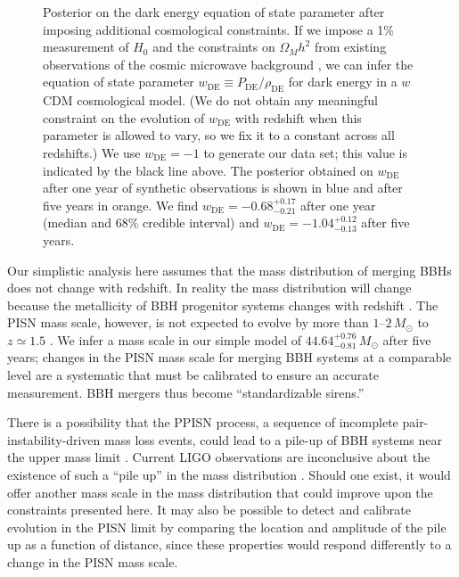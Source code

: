 \documentclass[modern]{aastex62}
\newcommand{\wDE}{w_\mathrm{DE}}
\newcommand{\MScaleFiveYear}{44.64^{+0.76}_{-0.81} \, \MSun{}}
\newcommand{\wDEOneYear}{-0.68^{+0.17}_{-0.21}}
\newcommand{\wDEFiveYear}{-1.04^{+0.12}_{-0.13}}
\newcommand{\MSun}{M_\odot}
\begin{document}
\begin{figure}
%
  \caption{\label{fig:wDE} Posterior on the dark energy equation of state
  parameter after imposing additional cosmological constraints.  If we impose a
  1\% measurement of $H_0$ \citep{Chen2017,Mortlock2018,2018PhRvD..98h3523D} and the constraints on
  $\Omega_M h^2$ from existing observations of the cosmic microwave background
  \citep{Planck2016}, we can infer the equation of state parameter $\wDE{}
  \equiv P_\mathrm{DE} / \rho_\mathrm{DE}$ for dark energy in a $w$CDM
  cosmological model.  (We do not obtain any meaningful constraint on the
  evolution of $\wDE{}$ with redshift when this parameter is allowed to vary, so
  we fix it to a constant across all redshifts.)  We use $\wDE{} = -1$ to
  generate our data set; this value is indicated by the black line above.  The
  posterior obtained on $\wDE{}$ after one year of synthetic observations is
  shown in blue and after five years in orange.  We find $\wDE{} =
  \wDEOneYear{}$ after one year (median and 68\% credible interval) and $\wDE{}
  = \wDEFiveYear{}$ after five years.}
%
\end{figure}

Our simplistic analysis here assumes that the mass distribution of merging
\acp{BBH} does not change with redshift.  In reality the mass distribution will
change because the metallicity of \ac{BBH} progenitor systems changes with
redshift \citep{Belczynski2016,Mapelli2017}.  The \ac{PISN} mass scale, however,
is not expected to evolve by more than $1$--$2\,\MSun{}$ to $z \simeq 1.5$
\citep{Belczynski2016,Mapelli2017}.  We infer a mass scale in our simple model
of $\MScaleFiveYear{}$ after five years; changes in the \ac{PISN} mass scale for
merging \ac{BBH} systems at a comparable level are a systematic that must be
calibrated to ensure an accurate measurement.  \ac{BBH} mergers thus become
``standardizable sirens.''

There is a possibility that the \ac{PPISN} process, a sequence of incomplete
pair-instability-driven mass loss events, could lead to a pile-up of \ac{BBH}
systems near the upper mass limit
\citep{Belczynski2016,Marchant2018,Talbot2018}.  Current LIGO observations are
inconclusive about the existence of such a ``pile up'' in the mass distribution
\citep{O1O2Population}.  Should one exist, it would offer another mass scale in
the mass distribution that could improve upon the constraints presented here. It
may also be possible to detect and calibrate evolution in the \ac{PISN} limit by
comparing the location and amplitude of the pile up as a function of distance,
since these properties would respond differently to a change in the \ac{PISN}
mass scale.
\end{document}
